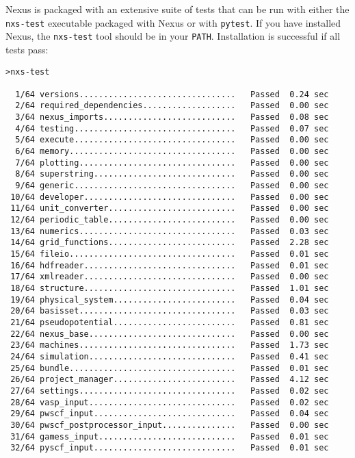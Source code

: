 \documentclass[oneside,11pt]{memoir}
\numberwithin{equation}{section}
\begin{document}
Nexus is packaged with an extensive suite of tests that can be run with either the \texttt{nxs-test} executable packaged with Nexus or with \texttt{pytest}.  If you have installed Nexus, the \texttt{nxs-test} tool should be in your \texttt{PATH}.  Installation is successful if all tests pass:

\begin{shaded}
\begin{verbatim}
>nxs-test

  1/64 versions................................   Passed  0.24 sec
  2/64 required_dependencies...................   Passed  0.00 sec
  3/64 nexus_imports...........................   Passed  0.08 sec
  4/64 testing.................................   Passed  0.07 sec
  5/64 execute.................................   Passed  0.00 sec
  6/64 memory..................................   Passed  0.00 sec
  7/64 plotting................................   Passed  0.00 sec
  8/64 superstring.............................   Passed  0.00 sec
  9/64 generic.................................   Passed  0.00 sec
 10/64 developer...............................   Passed  0.00 sec
 11/64 unit_converter..........................   Passed  0.00 sec
 12/64 periodic_table..........................   Passed  0.00 sec
 13/64 numerics................................   Passed  0.03 sec
 14/64 grid_functions..........................   Passed  2.28 sec
 15/64 fileio..................................   Passed  0.01 sec
 16/64 hdfreader...............................   Passed  0.01 sec
 17/64 xmlreader...............................   Passed  0.00 sec
 18/64 structure...............................   Passed  1.01 sec
 19/64 physical_system.........................   Passed  0.04 sec
 20/64 basisset................................   Passed  0.03 sec
 21/64 pseudopotential.........................   Passed  0.81 sec
 22/64 nexus_base..............................   Passed  0.00 sec
 23/64 machines................................   Passed  1.73 sec
 24/64 simulation..............................   Passed  0.41 sec
 25/64 bundle..................................   Passed  0.01 sec
 26/64 project_manager.........................   Passed  4.12 sec
 27/64 settings................................   Passed  0.02 sec
 28/64 vasp_input..............................   Passed  0.02 sec
 29/64 pwscf_input.............................   Passed  0.04 sec
 30/64 pwscf_postprocessor_input...............   Passed  0.00 sec
 31/64 gamess_input............................   Passed  0.01 sec
 32/64 pyscf_input.............................   Passed  0.01 sec

\end{verbatim}
\end{shaded}
\end{document}
